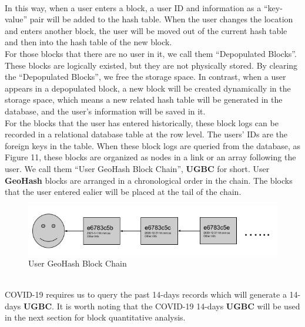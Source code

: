 \documentclass[sigplan,screen]{acmart}
\begin{document}
\\
In this way, when a user enters a block, a user ID and information as a ``key-value'' pair will be added to the hash table.
When the user changes the location and enters another block, the user will be moved out of the current hash table and then into the hash table of the new block.
\\
For those blocks that there are no user in it, we call them ``Depopulated Blocks''.
These blocks are logically existed, but they are not physically stored.
By clearing the ``Depopulated Blocks'', we free the storage space.
In contrast, when a user appears in a depopulated block, a new block will be created dynamically in the storage space, which means a new related hash table will be generated in the database, and the user's information will be saved in it.
\\
For the blocks that the user has entered historically, these block logs can be recorded in a relational database table at the row level.
The users' IDs are the foreign keys in the table.
When these block logs are queried from the database, as Figure 11, these blocks are organized as nodes in a link or an array following the user.
We call them ``User GeoHash Block Chain'', \textbf{UGBC} for short.
User \textbf{GeoHash} blocks are arranged in a chronological order in the chain.
The blocks that the user entered ealier will be placed at the tail of the chain.
\begin{figure}[htb]
	\centering\includegraphics[width=\linewidth]{block-log.png}
	\caption{User GeoHash Block Chain}
\end{figure}
\\
COVID-19 requires us to query the past 14-days records which will generate a 14-days \textbf{UGBC}.
It is worth noting that the COVID-19 14-days \textbf{UGBC} will be used in the next section for block quantitative analysis.
\end{document}
